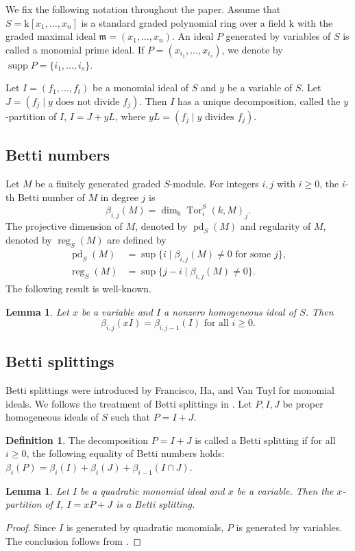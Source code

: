 \documentclass[12pt,amscd]{amsart}
\newtheorem{lem}[thm]{Lemma}
\theoremstyle{definition}
\newtheorem{defn}[thm]{Definition}
\numberwithin{equation}{section}
\DeclareMathOperator{\Tor}{Tor}
\DeclareMathOperator{\pd}{pd}
\DeclareMathOperator{\supp}{supp}
\DeclareMathOperator{\reg}{reg}
\def\m {\mathfrak m}
\def\k {\mathrm{k}}
\begin{document}
We fix the following notation throughout the paper. Assume that $S = \k[x_1,\ldots,x_n]$ is a standard graded polynomial ring over a field $\k$ with the graded maximal ideal $\m = (x_1,\ldots,x_n)$. An ideal $P$ generated by variables of $S$ is called a monomial prime ideal. If $P = (x_{i_1}, \ldots, x_{i_s})$, we denote by $\supp P = \{i_1, \ldots, i_s\}$.

Let $I = (f_1, \ldots, f_t)$ be a monomial ideal of $S$ and $y$ be a variable of $S$. Let $J = (f_j \mid y \text{ does not divide } f_j)$. Then $I$ has a unique decomposition, called the $y$-partition of $I$, $I = J + yL$, where $yL = (f_j \mid y \text{ divides } f_j)$.


\subsection{Betti numbers} Let $M$ be a finitely generated graded $S$-module. For integers $i,j$ with $i \ge 0$, the $i$-th Betti number of $M$ in degree $j$ is 
$$\beta_{i,j}(M) = \dim_\k \Tor_i^S(k,M)_j.$$
The projective dimension of $M$, denoted by $\pd_S(M)$ and regularity of $M$, denoted by $\reg_S(M)$ are defined by 
\begin{align*}
    \pd_S(M) &= \sup \{ i\mid \beta_{i,j}(M) \neq 0 \text{ for some } j\},\\
    \reg_S(M) &= \sup \{ j -i \mid \beta_{i,j}(M) \neq 0\}. 
\end{align*}
The following result is well-known.
\begin{lem}\label{lem_mul_x} Let $x$ be a variable and $I$ a nonzero homogeneous ideal of $S$. Then 
$$\beta_{i,j}(xI) = \beta_{i,j-1}(I) \text{ for all } i \ge 0.$$
\end{lem}

\subsection{Betti splittings}
Betti splittings were introduced by Francisco, Ha, and Van Tuyl \cite{FHV} for monomial ideals. We follows the treatment of Betti splittings in \cite{NV}. Let $P,I,J$ be proper homogeneous ideals of $S$ such that $P = I + J$.
\begin{defn} The decomposition $P = I + J$ is called a Betti splitting if for all $i \ge 0$, the following equality of Betti numbers holds: $\beta_i(P) = \beta_i(I) + \beta_i(J) + \beta_{i-1}(I \cap J)$.    
\end{defn}


\begin{lem}\label{lem_Koszul_variable_split} Let $I$ be a quadratic monomial ideal and $x$ be a variable. Then the $x$-partition of $I$, $I = xP + J$ is a Betti splitting.
\end{lem}
\begin{proof}
    Since $I$ is generated by quadratic monomials, $P$ is generated by variables. The conclusion follows from \cite[Corollary 4.12]{NV}.
\end{proof}
\end{document}
